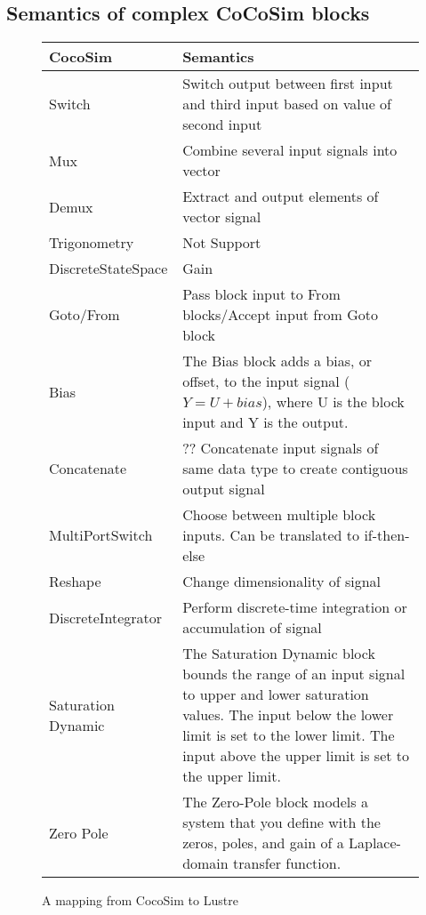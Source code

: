 \documentclass{article}
\begin{document}
\subsection{Semantics of complex CoCoSim blocks}

\begin{figure}[t]
\centering
{
\begin{tabular}{lp{5cm}}
\hline
\textbf{CocoSim} & \textbf{Semantics}  \\
\hline
Switch &
{Switch output between first input and third input based on value of second input}

\\
Mux &
Combine several input signals into vector
\\


Demux &
Extract and output elements of vector signal
\\

Trigonometry &
Not Support
\\

DiscreteStateSpace &
Gain
\\

Goto/From &
Pass block input to From blocks/Accept input from Goto block
\\

Bias &
The Bias block adds a bias, or offset, to the input signal ($Y = U + bias$), where U is the block input and Y is the output.
\\

Concatenate &
?? Concatenate input signals of same data type to create contiguous output signal
\\

MultiPortSwitch &
Choose between multiple block inputs. Can be translated to if-then-else
\\

Reshape &
Change dimensionality of signal
\\

DiscreteIntegrator &
Perform discrete-time integration or accumulation of signal
\\

Saturation Dynamic &
The Saturation Dynamic block bounds the range of an input signal to upper and lower saturation values. The input below the lower limit is set to the lower limit. The input above the upper limit is set to the upper limit.
\\

Zero Pole &
The Zero-Pole block models a system that you define with the zeros, poles, and gain of a Laplace-domain transfer function. 
\\

\hline
\end{tabular}
}
\caption{A mapping from CocoSim to Lustre}
\label{mapping2}
\end{figure}
\end{document}
